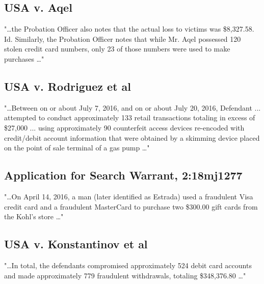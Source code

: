 \subsection*{USA v. Aqel \cite{aqel}}
"\dots the Probation Officer also notes that the actual loss to victims
was \$8,327.58. Id. Similarly, the Probation Officer notes that while Mr. Aqel possessed 120 stolen credit
card numbers, only 23 of those numbers were used to make purchases \dots" 

\subsection*{USA v. Rodriguez et al \cite{rodriguez}}
"\dots Between on or about July 7, 2016, and on or about July 20, 2016, Defendant ... attempted to conduct approximately 133 retail transactions totaling in excess of \$27,000 ... using approximately 90 counterfeit access devices re-encoded with credit/debit account information that were obtained by a skimming device placed on the point of sale terminal of a gas pump \dots " 

\subsection*{Application for Search Warrant, 2:18mj1277\cite{estrada}}
"\dots On April 14, 2016, a man (later identified as Estrada) used a fraudulent Visa credit card and a fraudulent MasterCard to purchase two \$300.00 gift cards from the Kohl's store \dots"

\subsection*{USA v. Konstantinov et al \cite{alisuretove}}
"\dots In total, the defendants compromised approximately 524 debit card accounts and made approximately 779 fraudulent withdrawals, totaling \$348,376.80 \dots"

